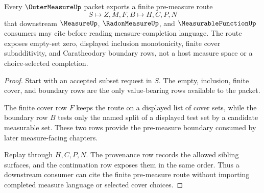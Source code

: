 \begin{theorem}
\label{thm:outer-measure-finite-premeasure-route}
Every $\OuterMeasureUp$ packet exports a finite pre-measure route
$$
S \longmapsto Z,M,F,B \longmapsto H,C,P,N
$$
that downstream $\MeasureUp$, $\RadonMeasureUp$, and $\MeasurableFunctionUp$ consumers may cite before reading measure-completion language. The route exposes empty-set zero, displayed inclusion monotonicity, finite cover subadditivity, and Caratheodory boundary rows, not a host measure space or a choice-selected completion.
\end{theorem}
\begin{proof}
Start with an accepted subset request in $S$. The empty, inclusion, finite cover, and boundary rows are the only value-bearing rows available to the packet.

The finite cover row $F$ keeps the route on a displayed list of cover sets, while the boundary row $B$ tests only the named split of a displayed test set by a candidate measurable set. These two rows provide the pre-measure boundary consumed by later measure-facing chapters.

Replay through $H,C,P,N$. The provenance row records the allowed sibling surfaces, and the continuation row exposes them in the same order. Thus a downstream consumer can cite the finite pre-measure route without importing completed measure language or selected cover choices.
\end{proof}



